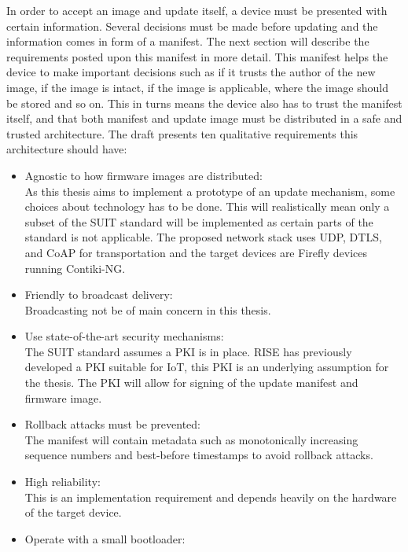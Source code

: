 \documentclass[0-thesis.tex]{subfiles}
\begin{document}
In order to accept an image and update itself, a device must be presented with certain 
information. Several decisions must be made before updating and the information comes in 
form of a manifest. The next section will describe the requirements posted upon this 
manifest in more detail. This manifest helps the device to make important decisions such as 
if it trusts the author of the new image, if the image is intact, if the image is applicable,
where the image should be stored and so on. This in turns means the device also has to trust 
the manifest itself, and that both manifest and update image must be distributed in a safe and 
trusted architecture. The draft \parencite{suit-architecture} presents ten qualitative 
requirements this architecture should have:
\begin{itemize}
    \item Agnostic to how firmware images are distributed:\\
            As this thesis aims to implement a prototype of an update mechanism, 
            some choices about technology has to be done. This will realistically mean 
            only a subset of the SUIT standard will be implemented as certain parts of the 
            standard is not applicable. The proposed network stack uses UDP, DTLS, and CoAP 
            for transportation and the target devices are Firefly devices running Contiki-NG.
    \item Friendly to broadcast delivery:\\
            Broadcasting not be of main concern in this thesis.
    \item Use state-of-the-art security mechanisms:\\
            The SUIT standard assumes a PKI is in place. RISE has previously developed a PKI
            suitable for IoT, this PKI is an underlying assumption for the thesis. The PKI 
            will allow for signing of the update manifest and firmware image.
    \item Rollback attacks must be prevented:\\
            The manifest will contain metadata such as monotonically increasing sequence 
            numbers and best-before timestamps to avoid rollback attacks.
    \item High reliability:\\
            This is an implementation requirement and depends heavily on the hardware of the 
            target device.
    \item Operate with a small bootloader:\\

\end{itemize}
\end{document}
